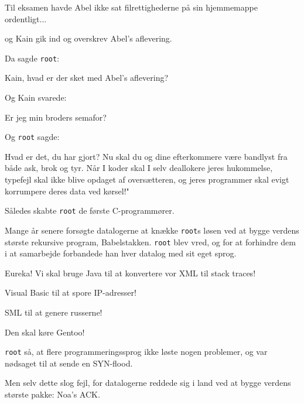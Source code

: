 \documentclass[a4paper,11pt]{article}
\begin{document}
\begin{sketch}
   Til eksamen havde Abel ikke sat filrettighederne på sin
  hjemmemappe ordentligt...


   og Kain gik ind og overskrev Abel's aflevering.


  Da sagde \texttt{root}:

   Kain, hvad er der sket med Abel's aflevering?

   Og Kain svarede: 
  
   Er jeg min broders semafor?

   Og \texttt{root} sagde:

   Hvad er det, du har gjort?  Nu skal du og dine
  efterkommere være bandlyst fra både ask, brok og tyr.  Når I koder
  skal I selv deallokere jeres hukommelse, typefejl skal ikke blive
  opdaget af oversætteren, og jeres programmer skal evigt korrumpere
  deres data ved kørsel!"

   Således skabte \texttt{root} de første C-programmører.


   Mange år senere forsøgte datalogerne at knække
  \texttt{root}s løsen ved at bygge verdens største rekursive program,
  Babelstakken.  \texttt{root} blev vred, og for at forhindre dem i at
  samarbejde forbandede han hver datalog med sit eget sprog.

   Eureka!  Vi skal bruge Java til at konvertere vor XML til stack traces!

   Visual Basic til at spore IP-adresser!

   SML til at genere russerne!

   Den skal køre Gentoo!


   \texttt{root} så, at flere programmeringssprog ikke løste
  nogen problemer, og var nødsaget til at sende en SYN-flood.
  

   Men selv dette slog fejl, for datalogerne reddede sig i
  land ved at bygge verdens største pakke: Noa's ACK.


\end{sketch}
\end{document}
